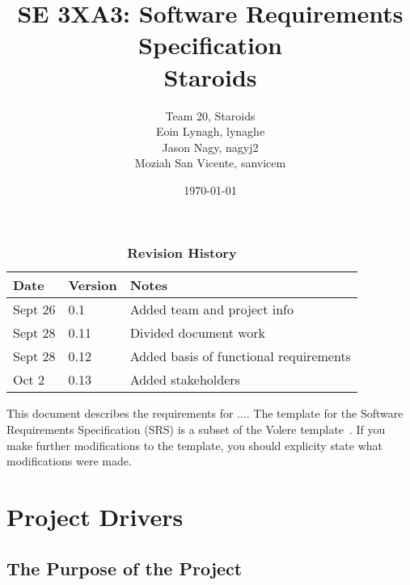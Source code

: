\documentclass[12pt, titlepage]{article}
\title{SE 3XA3: Software Requirements Specification\\Staroids}
\author{Team 20, Staroids
		\\ Eoin Lynagh, lynaghe
		\\ Jason Nagy, nagyj2
		\\ Moziah San Vicente, sanvicem
}
\date{\today}
\begin{document}
\maketitle

\tableofcontents
\listoftables
\listoffigures

\begin{table}[bp]
\caption{\bf Revision History}
\begin{tabularx}{\textwidth}{p{3cm}p{2cm}X}
\toprule {\bf Date} & {\bf Version} & {\bf Notes}\\
\midrule
Sept 26 & 0.1 & Added team and project info\\
Sept 28 & 0.11 & Divided document work\\
Sept 28 & 0.12 & Added basis of functional requirements\\
Oct 2 & 0.13 & Added stakeholders
\bottomrule
\end{tabularx}
\end{table}

\newpage




This document describes the requirements for ....  The template for the Software
Requirements Specification (SRS) is a subset of the Volere
template~\citep{RobertsonAndRobertson2012}.  If you make further modifications
to the template, you should explicity state what modifications were made.

\section{Project Drivers}

\subsection{The Purpose of the Project}
\end{document}
